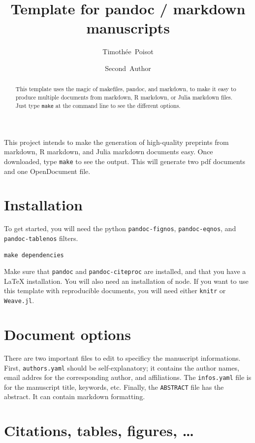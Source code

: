 \documentclass[12pt]{article}
\title{Template for pandoc / markdown manuscripts}
\author[1,2]{Timothée~Poisot}
\author[2,3]{Second~Author}
\affil[1]{Université de Montréal, Département de Sciences Biologiques}
\affil[2]{Québec Centre for Biodiversity Sciences}
\affil[3]{University of Whatever}
\begin{document}
\maketitle

\begin{abstract}
  This template uses the magic of makefiles, pandoc, and markdown, to make
  it easy to produce multiple documents from markdown, R markdown, or
  Julia markdown files. Just type \lstinline!make! at the command line to
  see the different options.
\end{abstract}

This project intends to make the generation of high-quality preprints
from markdown, R markdown, and Julia markdown documents easy. Once
downloaded, type \lstinline!make! to see the output. This will generate
two pdf documents and one OpenDocument file.

\section{Installation}\label{installation}

To get started, you will need the python \lstinline!pandoc-fignos!,
\lstinline!pandoc-eqnos!, and \lstinline!pandoc-tablenos! filters.

\begin{lstlisting}
make dependencies
\end{lstlisting}

Make sure that \lstinline!pandoc! and \lstinline!pandoc-citeproc! are
installed, and that you have a LaTeX installation. You will also need an
installation of node. If you want to use this template with reproducible
documents, you will need either \lstinline!knitr! or
\lstinline!Weave.jl!.

\section{Document options}\label{document-options}

There are two important files to edit to specificy the manuscript
informations. First, \lstinline!authors.yaml! should be
self-explanatory; it contains the author names, email addres for the
corresponding author, and affiliations. The \lstinline!infos.yaml! file
is for the manuscript title, keywords, etc. Finally, the
\lstinline!ABSTRACT! file has the abstract. It can contain markdown
formatting.

\section{Citations, tables, figures, \ldots{}}\label{sec:citation}
\end{document}
